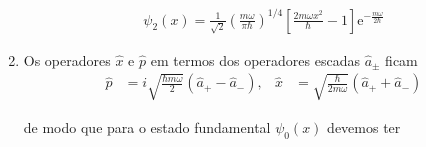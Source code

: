 \begin{prob}
\begin{sol}
\begin{enumerate}[label=\alph *)]
				\begin{align}
						\boxed{
							\psi_{2}(x)= \frac{1}{\sqrt{2}}\left(\frac{m \omega}{\pi \hbar}\right)^{1/4}\left[\frac{2m \omega x^{2}}{\hbar}-1\right]\mathrm{e}^{-\frac{m \omega}{2\hbar}}
						}
				\end{align}
			\item Os operadores $\hat{x}$ e $\hat{p}$ em termos dos operadores escadas $\hat{a}_{\pm}$ ficam
				\begin{align}
					\hat{p} &= i\sqrt{\frac{\hbar m \omega }{2}}\left(\hat{a}_{+}-\hat{a}_{-}\right), & \hat{x} &= \sqrt{\frac{\hbar}{2m \omega}}\left(\hat{a}_{+}+\hat{a}_{-}\right)
				\end{align}
				 
				de modo que para o estado fundamental $\psi_{0}(x)$ devemos ter
				 

\end{enumerate}
\end{sol}
\end{prob}
